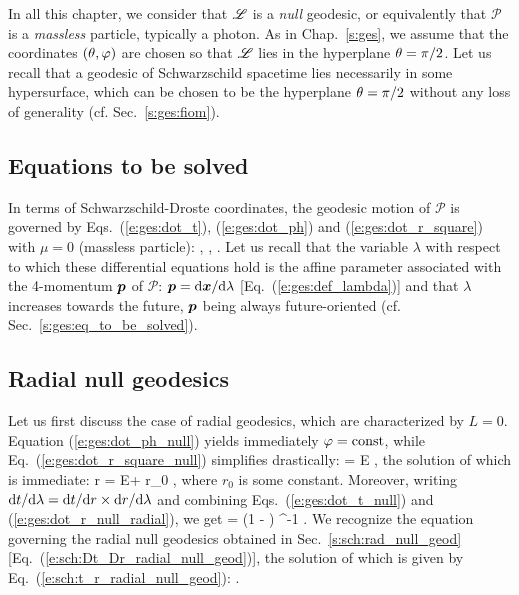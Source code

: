 In all this chapter, we consider that $\mathscr{L}$ is a \emph{null}
geodesic, or equivalently that
$\mathscr{P}$ is a \emph{massless} particle, typically a photon.
As in Chap.~\ref{s:ges}, we assume that the coordinates $(\theta,\varphi)$ are chosen
so that $\mathscr{L}$ lies in the hyperplane $\theta=\pi/2$. Let us recall that
a geodesic of Schwarzschild spacetime lies necessarily in some hypersurface, which
can be chosen to be the hyperplane $\theta=\pi/2$ without any loss of generality
(cf. Sec.~\ref{s:ges:fiom}).

\subsection{Equations to be solved}

In terms of Schwarzschild-Droste coordinates, the geodesic motion of $\mathscr{P}$ is governed by Eqs.~(\ref{e:ges:dot_t}), (\ref{e:ges:dot_ph}) and (\ref{e:ges:dot_r_square})
with $\mu=0$ (massless particle):
\be \label{e:ges:dot_t_null}
    ,
\ee
\be \label{e:ges:dot_ph_null}
   ,
\ee
\be \label{e:ges:dot_r_square_null}
   .
\ee
Let us recall that the variable $\lambda$ with respect to which these differential equations
hold
is the affine parameter associated with the 4-momentum $\bm{p}$ of $\mathscr{P}$:
$\bm{p} = \mathrm{d}\bm{x}/\mathrm{d}\lambda$ [Eq.~(\ref{e:ges:def_lambda})] and that
$\lambda$ increases towards the future,
$\bm{p}$ being always future-oriented (cf. Sec.~\ref{s:ges:eq_to_be_solved}).

\subsection{Radial null geodesics} \label{s:gis:radial}

Let us first discuss the case of radial geodesics, which are characterized by $L=0$.
Equation (\ref{e:ges:dot_ph_null}) yields immediately $\varphi=\mathrm{const}$,
while Eq.~(\ref{e:ges:dot_r_square_null}) simplifies drastically:
\be \label{e:ges:dot_r_null_radial}
     = \pm E ,
\ee
the solution of which is immediate:
\be \label{e:ges:r_lambda_radial_null}
    r = \pm E\lambda + r_0 ,
\ee
where $r_0$ is some constant.
Moreover, writing $\mathrm{d} t/\mathrm{d}\lambda = \mathrm{d} t/\mathrm{d} r \times \mathrm{d} r/\mathrm{d}\lambda$
and combining Eqs.~(\ref{e:ges:dot_t_null}) and (\ref{e:ges:dot_r_null_radial}),
we get
\be \label{e:gis:dtdr_radial_geod}
     = \pm \left(1 -  \right) ^{-1} .
\ee
We recognize the equation governing the radial null geodesics obtained in
Sec.~\ref{s:sch:rad_null_geod} [Eq.~(\ref{e:sch:Dt_Dr_radial_null_geod})],
the solution of which is given by Eq.~(\ref{e:sch:t_r_radial_null_geod}):
\be
   .
\ee

